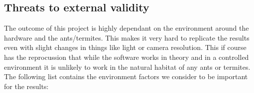 \subsection{Threats to external validity}

The outcome of this project is highly dependant on the environment around the hardware and the ants/termites. This makes it very hard to replicate the results even with slight changes in things like light or camera resolution. This if course has the reprocussion that while the software works in theory and in a controlled environment it is unlikely to work in the natural habitat of any ants or termites. The following list contains the environment factors we consider to be important for the results:

